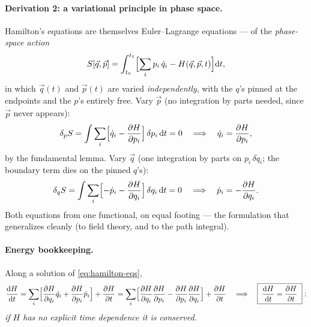 \documentclass[11pt]{article}
\theoremstyle{plain}
\theoremstyle{definition}
\theoremstyle{remark}
\newcommand{\dd}{\mathrm{d}}
\newcommand{\pd}[2]{\frac{\partial #1}{\partial #2}}
\newcommand{\vq}{\vec{q}}
\newcommand{\vp}{\vec{p}}
\begin{document}
\paragraph{Derivation 2: a variational principle in phase space.}
Hamilton's equations are themselves Euler--Lagrange equations --- of the
\emph{phase-space action}
\begin{equation}
  S[\vq, \vp]
  = \int_{t_0}^{t_1}\Bigl[\sum_i p_i\,\dot q_i - H(\vq,\vp,t)\Bigr]\dd t ,
\end{equation}
in which $\vq(t)$ and $\vp(t)$ are varied \emph{independently}, with the
$q$'s pinned at the endpoints and the $p$'s entirely free. Vary $\vp$
(no integration by parts needed, since $\dot\vp$ never appears):
\begin{equation}
  \delta_p S = \int \sum_i \Bigl[\dot q_i - \pd{H}{p_i}\Bigr]\,
  \delta p_i \,\dd t = 0
  \quad\Longrightarrow\quad
  \dot q_i = \pd{H}{p_i} ,
\end{equation}
by the fundamental lemma. Vary $\vq$ (one integration by parts on
$p_i\,\delta\dot q_i$; the boundary term dies on the pinned $q$'s):
\begin{equation}
  \delta_q S = \int \sum_i\Bigl[-\dot p_i - \pd{H}{q_i}\Bigr]\,
  \delta q_i\,\dd t = 0
  \quad\Longrightarrow\quad
  \dot p_i = -\pd{H}{q_i} .
\end{equation}
Both equations from one functional, on equal footing --- the formulation
that generalizes cleanly (to field theory, and to the path integral).

\paragraph{Energy bookkeeping.}
Along a solution of \eqref{eq:hamilton-eqs},
\begin{equation}
  \frac{\dd H}{\dd t}
  = \sum_i\Bigl[\pd{H}{q_i}\dot q_i + \pd{H}{p_i}\dot p_i\Bigr] + \pd{H}{t}
  = \sum_i\Bigl[\pd{H}{q_i}\pd{H}{p_i} - \pd{H}{p_i}\pd{H}{q_i}\Bigr] + \pd{H}{t}
  \quad\Longrightarrow\quad
  \boxed{\;\frac{\dd H}{\dd t} = \pd{H}{t}\;} :
\end{equation}
\emph{if $H$ has no explicit time dependence it is conserved}.
\end{document}
